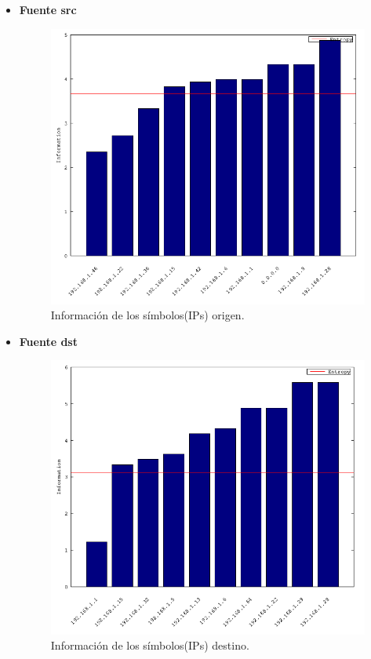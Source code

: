 \documentclass[10pt, a4paper]{article}
\begin{document}
\begin{itemize}
\item \textbf{Fuente src}

\begin{figure}[H] %
\begin{center}
\includegraphics[width=400pt]{../imgs/tiarg_src_chartbar.png}
\caption{Información de los símbolos(IPs) origen.}
\end{center}
\end{figure}

\newpage
\item \textbf{Fuente dst}

%
\begin{figure}[H] %
\begin{center}
\includegraphics[width=400pt]{../imgs/tiarg_dst_chartbar.png}
\caption{Información de los símbolos(IPs) destino.}
\end{center}
\end{figure}

\end{itemize}
\end{document}
